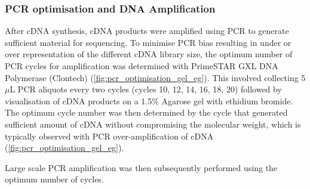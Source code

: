 \subsubsection{PCR optimisation and DNA Amplification}\label{ch: pcr_optimisation}
After cDNA synthesis, cDNA products were amplified using PCR to generate sufficient material for sequencing. To minimise PCR bias resulting in under or over representation of the different cDNA library size, the optimum number of PCR cycles for amplification was determined with PrimeSTAR GXL DNA Polymerase (Clontech) (\cref{fig:pcr_optimisation_gel_eg}). This involved collecting 5$\mu$L PCR aliquots every two cycles (cycles 10, 12, 14, 16, 18, 20) followed by visualisation of cDNA products on a 1.5\% Agarose gel with ethidium bromide. The optimum cycle number was then determined by the cycle that generated sufficient amount of cDNA without compromising the molecular weight, which is typically observed with PCR over-amplification of cDNA (\cref{fig:pcr_optimisation_gel_eg}). 

 Large scale PCR amplification was then subsequently performed using the optimum number of cycles. 


